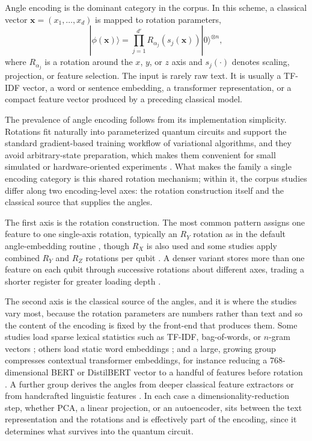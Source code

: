 \documentclass{ieeeaccess}
\begin{document}
Angle encoding is the dominant category in the corpus. In this scheme, a classical vector $\mathbf{x} = (x_1,\ldots,x_d)$ is mapped to rotation parameters,
\begin{equation}
|\phi(\mathbf{x})\rangle =
\prod_{j=1}^{d'} R_{\alpha_j}(s_j(\mathbf{x})) |0\rangle^{\otimes n},
\end{equation}
where $R_{\alpha_j}$ is a rotation around the $x$, $y$, or $z$ axis and $s_j(\cdot)$ denotes scaling, projection, or feature selection. The input is rarely raw text. It is usually a TF-IDF vector, a word or sentence embedding, a transformer representation, or a compact feature vector produced by a preceding classical model.

The prevalence of angle encoding follows from its implementation simplicity. Rotations fit naturally into parameterized quantum circuits and support the standard gradient-based training workflow of variational algorithms, and they avoid arbitrary-state preparation, which makes them convenient for small simulated or hardware-oriented experiments \cite{mitarai2018quantum,schuld2019evaluating}. What makes the family a single encoding category is this shared rotation mechanism; within it, the corpus studies differ along two encoding-level axes: the rotation construction itself and the classical source that supplies the angles.

The first axis is the rotation construction. The most common pattern assigns one feature to one single-axis rotation, typically an $R_Y$ rotation as in the default angle-embedding routine \cite{ruskanda_evaluating_2025,kesiku_quantum_2025,diaz-ortiz_strongly_2024}, though $R_X$ is also used \cite{day_qnet_2023,zhou_new_2022,tiwari_quantum_2024} and some studies apply combined $R_Y$ and $R_Z$ rotations per qubit \cite{stein_applying_2023}. A denser variant stores more than one feature on each qubit through successive rotations about different axes, trading a shorter register for greater loading depth \cite{kesiku_unlocking_2026}.

The second axis is the classical source of the angles, and it is where the studies vary most, because the rotation parameters are numbers rather than text and so the content of the encoding is fixed by the front-end that produces them. Some studies load sparse lexical statistics such as TF-IDF, bag-of-words, or $n$-gram vectors \cite{boopalamani_quantum-enhanced_2025,payares_quantum_2023,kabir_qtopic_2026}; others load static word embeddings \cite{di_sipio_dawn_2022,diaz-ortiz_strongly_2024,ohno_quantum_2025}; and a large, growing group compresses contextual transformer embeddings, for instance reducing a 768-dimensional BERT or DistilBERT vector to a handful of features before rotation \cite{ahmad_hybrid_2023,kumar_hybrid_2026,suleiman_hdqe_2026,yu_application_2024}. A further group derives the angles from deeper classical feature extractors or from handcrafted linguistic features \cite{rezaei_hybrid_2026,mukesh_qvila_2024,mompelat_compact_2026}. In each case a dimensionality-reduction step, whether PCA, a linear projection, or an autoencoder, sits between the text representation and the rotations and is effectively part of the encoding, since it determines what survives into the quantum circuit.
\end{document}
